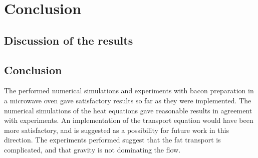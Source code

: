 \chapter{Conclusion}
\section{Discussion of the results}

\section{Conclusion}
The performed numerical simulations and experiments with bacon preparation
in a microwave oven gave satisfactory results so far as they were implemented. 
The numerical simulations of the heat equations gave reasonable results in agreement
with experiments. An implementation of the transport equation would have been
more satisfactory, and is suggested as a possibility for future work in this
direction. The experiments performed suggest that the fat transport is
complicated, and that gravity is not dominating the flow. 


